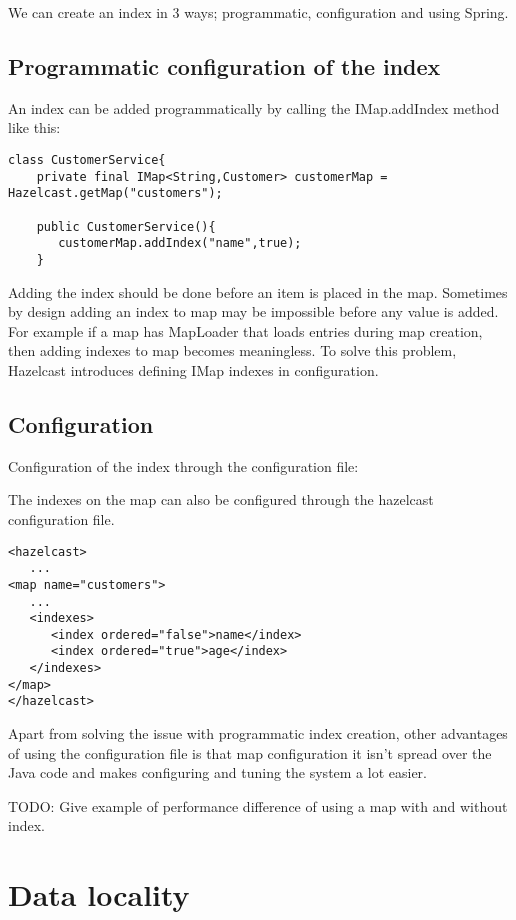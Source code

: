 We can create an index in 3 ways; programmatic, configuration and using Spring.


\subsection{Programmatic configuration of the index}

An index can be added programmatically by calling the IMap.addIndex method like this:

\begin{verbatim}
class CustomerService{
    private final IMap<String,Customer> customerMap = Hazelcast.getMap("customers");

    public CustomerService(){
       customerMap.addIndex("name",true);
    }
\end{verbatim}

Adding the index should be done before an item is placed in the map. Sometimes by design adding an index to map may be impossible before any value is added. For example if a map has MapLoader that loads entries during map creation, then adding indexes to map becomes meaningless. To solve this problem, Hazelcast introduces defining IMap indexes in configuration.

\subsection{Configuration}
Configuration of the index through the configuration file:

The indexes on the map can also be configured through the hazelcast configuration file. 

\begin{verbatim}
<hazelcast>
   ...
<map name="customers">
   ...
   <indexes>
      <index ordered="false">name</index>
      <index ordered="true">age</index>
   </indexes>
</map>
</hazelcast>
\end{verbatim}

Apart from solving the issue with programmatic index creation, other advantages of using the configuration file is that map configuration it isn't spread over the Java code and makes configuring and tuning the system a lot easier.

TODO: Give example of performance difference of using a map with and without index.

\section{Data locality}

